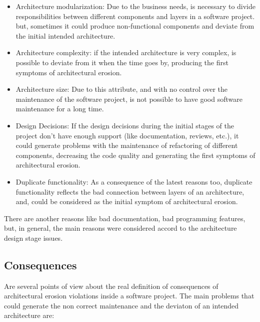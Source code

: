 \begin{itemize}
    \item Architecture modularization: Due to the business needs, is necessary to divide responsibilities between different components and layers in a software project. but, sometimes it could produce non-functional components and deviate from the initial intended architecture.
    \item  Architecture complexity: if the intended architecture is very complex, is possible to deviate from it when the time goes by, producing the first symptoms of architectural erosion.
    \item Architecture size: Due to this attribute, and with no control over the maintenance of the software project, is not possible to have good software maintenance for a long time.
    \item Design Decisions: If the design decisions during the initial stages of the project don't have enough support (like documentation, reviews, etc.), it could generate problems with the maintenance of refactoring of different components, decreasing the code quality and generating the first symptoms of architectural erosion.
    \item Duplicate functionality: As a consequence of the latest reasons too, duplicate functionality reflects the bad connection between layers of an architecture, and, could be considered as the initial symptom of architectural erosion.

\end{itemize}
There are another reasons like bad documentation, bad programming features, but, in general, the main reasons were considered accord to the architecture design stage issues.

\subsection{Consequences}
Are several points of view about the real definition of consequences of architectural erosion violations inside a software project. The main problems that could generate the non correct maintenance and the deviaton of an intended architecture are:

